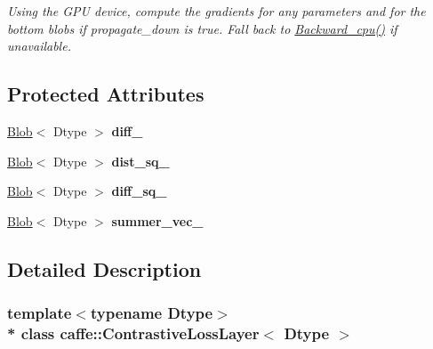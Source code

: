 \begin{DoxyCompactItemize}
\begin{DoxyCompactList}\small\item\em Using the G\+PU device, compute the gradients for any parameters and for the bottom blobs if propagate\+\_\+down is true. Fall back to \hyperlink{classcaffe_1_1ContrastiveLossLayer_ac29d021f30dbab75ca14cb79446926e5}{Backward\+\_\+cpu()} if unavailable. \end{DoxyCompactList}\end{DoxyCompactItemize}
\subsection*{Protected Attributes}
\begin{DoxyCompactItemize}
\item 
\hyperlink{classcaffe_1_1Blob}{Blob}$<$ Dtype $>$ {\bfseries diff\+\_\+}\hypertarget{classcaffe_1_1ContrastiveLossLayer_a885617ad377571b4010d8a39f0a53d5e}{}\label{classcaffe_1_1ContrastiveLossLayer_a885617ad377571b4010d8a39f0a53d5e}

\item 
\hyperlink{classcaffe_1_1Blob}{Blob}$<$ Dtype $>$ {\bfseries dist\+\_\+sq\+\_\+}\hypertarget{classcaffe_1_1ContrastiveLossLayer_ab852b524ed8daee905f2f0eeddfb9807}{}\label{classcaffe_1_1ContrastiveLossLayer_ab852b524ed8daee905f2f0eeddfb9807}

\item 
\hyperlink{classcaffe_1_1Blob}{Blob}$<$ Dtype $>$ {\bfseries diff\+\_\+sq\+\_\+}\hypertarget{classcaffe_1_1ContrastiveLossLayer_a2e73f7304a21d8e265b6389c9e7095e6}{}\label{classcaffe_1_1ContrastiveLossLayer_a2e73f7304a21d8e265b6389c9e7095e6}

\item 
\hyperlink{classcaffe_1_1Blob}{Blob}$<$ Dtype $>$ {\bfseries summer\+\_\+vec\+\_\+}\hypertarget{classcaffe_1_1ContrastiveLossLayer_a7b67d18ffc05ea6acce6b8c1c2de82a4}{}\label{classcaffe_1_1ContrastiveLossLayer_a7b67d18ffc05ea6acce6b8c1c2de82a4}

\end{DoxyCompactItemize}


\subsection{Detailed Description}
\subsubsection*{template$<$typename Dtype$>$\\*
class caffe\+::\+Contrastive\+Loss\+Layer$<$ Dtype $>$}

